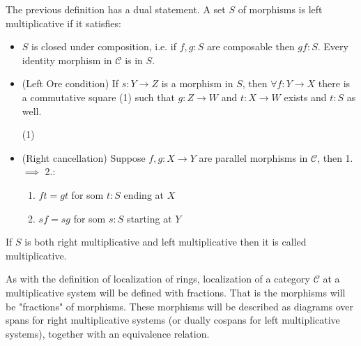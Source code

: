     \begin{remark}
        The previous definition has a dual statement. A set $S$ of morphisms is left multiplicative if it satisfies:
        \begin{itemize}
            \item $S$ is closed under composition, i.e. if $f,g : S$ are composable then $gf : S$. Every identity morphism in $\mathcal{C}$ is in $S$.
            \item (Left Ore condition) If $s : Y \rightarrow Z$ is a morphism in $S$, then $\forall f:Y\rightarrow X$ there is a commutative square (1) such that $g:Z\rightarrow W$ and $t:X\rightarrow W$ exists and $t:S$ as well.
            \begin{center}
                (1)
            \end{center}
            \item (Right cancellation) Suppose $f,g:X\rightarrow Y$ are parallel morphisms in $\mathcal{C}$, then 1. $\implies$ 2.:
            \begin{enumerate}
                \item $ft = gt$ for som $t:S$ ending at $X$
                \item $sf = sg$ for som $s:S$ starting at $Y$
            \end{enumerate}
        \end{itemize}
        If $S$ is both right multiplicative and left multiplicative then it is called multiplicative.
    \end{remark}


    As with the definition of localization of rings, localization of a category $\mathcal{C}$ at a multiplicative system will be defined with fractions. That is the morphisms will be "fractions" of morphisms. These morphisms will be described as diagrams over spans for right multiplicative systems (or dually cospans for left multiplicative systems), together with an equivalence relation.

